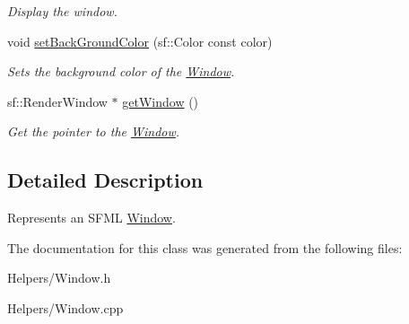 \begin{DoxyCompactItemize}
\begin{DoxyCompactList}\small\item\em Display the window. \end{DoxyCompactList}\item 
\hypertarget{classty_s_f_m_l_1_1_window_aa7af52733bf52d35ecf5b8d7e256d3b1}{}void \hyperlink{classty_s_f_m_l_1_1_window_aa7af52733bf52d35ecf5b8d7e256d3b1}{set\+Back\+Ground\+Color} (sf\+::\+Color const color)\label{classty_s_f_m_l_1_1_window_aa7af52733bf52d35ecf5b8d7e256d3b1}

\begin{DoxyCompactList}\small\item\em Sets the background color of the \hyperlink{classty_s_f_m_l_1_1_window}{Window}. \end{DoxyCompactList}\item 
\hypertarget{classty_s_f_m_l_1_1_window_a2e116b4ae884b7d104d19e427b7ec0f8}{}sf\+::\+Render\+Window $\ast$ \hyperlink{classty_s_f_m_l_1_1_window_a2e116b4ae884b7d104d19e427b7ec0f8}{get\+Window} ()\label{classty_s_f_m_l_1_1_window_a2e116b4ae884b7d104d19e427b7ec0f8}

\begin{DoxyCompactList}\small\item\em Get the pointer to the \hyperlink{classty_s_f_m_l_1_1_window}{Window}. \end{DoxyCompactList}\end{DoxyCompactItemize}


\subsection{Detailed Description}
Represents an S\+F\+M\+L \hyperlink{classty_s_f_m_l_1_1_window}{Window}. 

The documentation for this class was generated from the following files\+:\begin{DoxyCompactItemize}
\item 
Helpers/Window.\+h\item 
Helpers/Window.\+cpp\end{DoxyCompactItemize}
